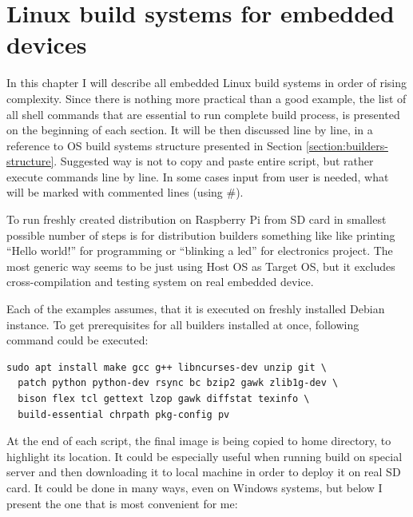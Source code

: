 \documentclass[printmode]{mgr}
\begin{document}
\chapter{Linux build systems for embedded devices}
\label{chapter:build-systems}






In this chapter I will describe all embedded Linux build systems in order of rising complexity.
Since there is nothing more practical than a good example, the list of all shell commands that are essential to run complete build process, is presented on the beginning of each section.
It will be then discussed line by line, in a reference to OS build systems structure presented in Section \ref{section:builders-structure}.
Suggested way is not to copy and paste entire script, but rather execute commands line by line.
In some cases input from user is needed, what will be marked with commented lines (using \#).

To run freshly created distribution on Raspberry Pi from SD card in smallest possible number of steps is for distribution builders something like like printing ``Hello world!'' for programming or ``blinking a led'' for electronics project.
The most generic way seems to be just using Host OS as Target OS, but it excludes cross-compilation and testing system on real embedded device.

Each of the examples assumes, that it is executed on freshly installed Debian instance.
To get prerequisites for all builders installed at once, following command could be executed:


\begin{lstlisting}
sudo apt install make gcc g++ libncurses-dev unzip git \
  patch python python-dev rsync bc bzip2 gawk zlib1g-dev \ 
  bison flex tcl gettext lzop gawk diffstat texinfo \
  build-essential chrpath pkg-config pv
\end{lstlisting}

At the end of each script, the final image is being copied to home directory, to highlight its location.
It could be especially useful when running build on special server and then downloading it to local machine in order to deploy it on real SD card.
It could be done in many ways, even on Windows systems, but below I present the one that is most convenient for me:
\end{document}
